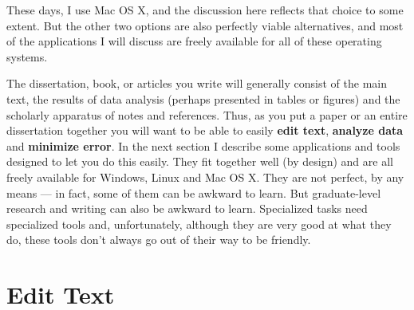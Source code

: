 \documentclass[11pt,article,oneside]{memoir}
\begin{document}
These days, I use Mac OS X, and the discussion here reflects that
choice to some extent. But the other two options are also perfectly
viable alternatives, and most of the applications I will discuss are
freely available for all of these operating systems.

The dissertation, book, or articles you write will generally consist
of the main text, the results of data analysis (perhaps presented in
tables or figures) and the scholarly apparatus of notes and
references. Thus, as you put a paper or an entire dissertation
together you will want to be able to easily \textbf{edit text},
\textbf{analyze data} and \textbf{minimize error}. In the next section
I describe some applications and tools designed to let you do this
easily. They fit together well (by design) and are all freely
available for Windows, Linux and Mac OS X. They are not perfect, by
any means --- in fact, some of them can be awkward to learn. But
graduate-level research and writing can also be awkward to
learn. Specialized tasks need specialized tools and, unfortunately,
although they are very good at what they do, these tools don't always
go out of their way to be friendly.
\section*{Edit Text}
\label{sec-4}
\end{document}
